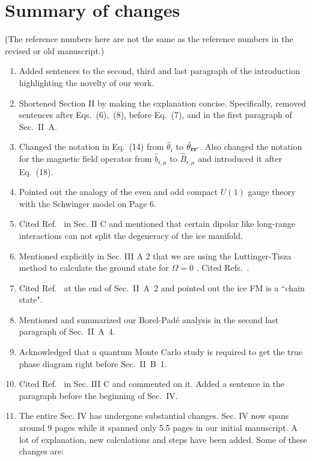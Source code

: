 \documentclass[
onecolumn,
superscriptaddress,
longbibliography,
nofootinbib,
 amsmath,amssymb,
 aps,
prb
]{revtex4-2}
\newcommand{\dual}[1]{\boldsymbol{\mathsf{#1}}}
\begin{document}
\section{Summary of changes}

(The reference numbers here are not the same as the reference numbers in the revised or old manuscript.)
\begin{enumerate}
    \item Added sentences to the second, third and last paragraph of the introduction highlighting the novelty of our work.
    \item Shortened Section II by making the explanation concise. Specifically, removed sentences after Eqs.~(6),~(8), before Eq.~(7), and in the first paragraph of Sec.~II~A.
    \item Changed the notation in Eq.~(14) from $\hat{\theta}_i$ to $\hat{\theta}_{\vb{r}\vb{r}'}$. Also changed the notation for the magnetic field operator from $\hat{b}_{\dual{r},\mu}$ to $\hat{B}_{\dual{r},\mu}$ and introduced it after Eq.~(18).
    \item Pointed out the analogy of the even and odd compact $U(1)$ gauge theory with the Schwinger model on Page 6.
    \item Cited Ref.~\cite{isakov2005why} in Sec. II C and mentioned that certain dipolar like long-range interactions can not split the degeneracy of the ice manifold.
    \item Mentioned explicitly in Sec. III A 2 that we are using the Luttinger-Tisza method to calculate the ground state for $\Omega=0$ . Cited Refs.~\cite{luttinger1946theory, lyons1960method,litvin1974luttinger}.
    \item Cited Ref.~\cite{mcclarty2015chain} at the end of Sec.~II~A~2 and pointed out the ice FM is a ``chain state".
    \item Mentioned and summarized our Borel-Pad\'e analysis in the second last paragraph of Sec.~II~A~4.
    \item Acknowledged that a quantum Monte Carlo study is required to get the true phase diagram right before Sec.~II~B~1.
    \item Cited Ref.~\cite{giudici2022dynamical} in Sec. III C and commented on it. Added a sentence in the paragraph before the beginning of Sec.~IV.
    \item  The entire Sec. IV has undergone substantial changes. Sec. IV now spans around 9 pages while it spanned only 5.5 pages in our initial manuscript. A lot of explanation, new calculations and steps have been added. Some of these changes are:

\end{enumerate}
\end{document}
